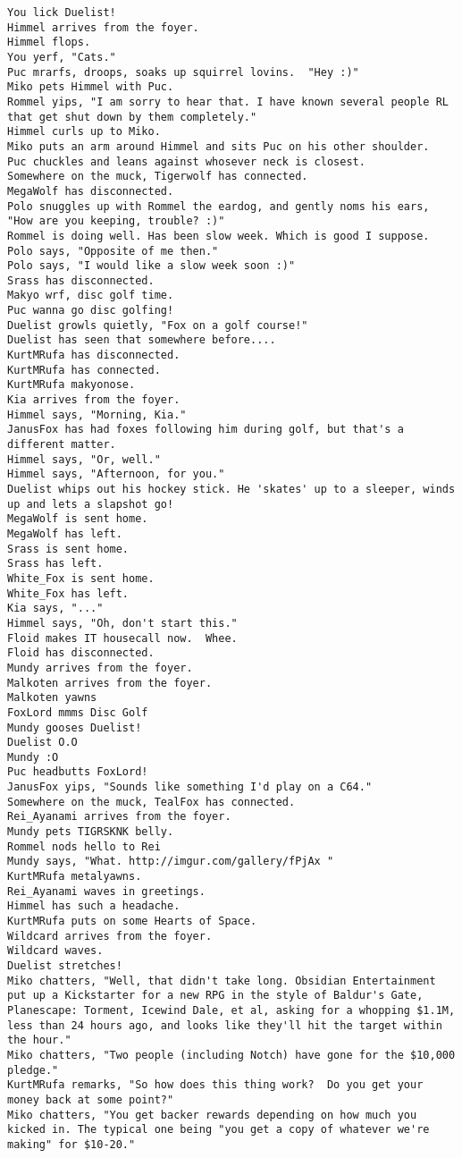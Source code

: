 \begin{verbatim}
You lick Duelist!
Himmel arrives from the foyer.
Himmel flops.
You yerf, "Cats."
Puc mrarfs, droops, soaks up squirrel lovins.  "Hey :)"
Miko pets Himmel with Puc.
Rommel yips, "I am sorry to hear that. I have known several people RL that get shut down by them completely."
Himmel curls up to Miko.
Miko puts an arm around Himmel and sits Puc on his other shoulder.
Puc chuckles and leans against whosever neck is closest.
Somewhere on the muck, Tigerwolf has connected.
MegaWolf has disconnected.
Polo snuggles up with Rommel the eardog, and gently noms his ears, "How are you keeping, trouble? :)"
Rommel is doing well. Has been slow week. Which is good I suppose.
Polo says, "Opposite of me then."
Polo says, "I would like a slow week soon :)"
Srass has disconnected.
Makyo wrf, disc golf time.
Puc wanna go disc golfing!
Duelist growls quietly, "Fox on a golf course!"
Duelist has seen that somewhere before....
KurtMRufa has disconnected.
KurtMRufa has connected.
KurtMRufa makyonose.
Kia arrives from the foyer.
Himmel says, "Morning, Kia."
JanusFox has had foxes following him during golf, but that's a different matter.
Himmel says, "Or, well."
Himmel says, "Afternoon, for you."
Duelist whips out his hockey stick. He 'skates' up to a sleeper, winds up and lets a slapshot go!
MegaWolf is sent home.
MegaWolf has left.
Srass is sent home.
Srass has left.
White_Fox is sent home.
White_Fox has left.
Kia says, "..."
Himmel says, "Oh, don't start this."
Floid makes IT housecall now.  Whee.
Floid has disconnected.
Mundy arrives from the foyer.
Malkoten arrives from the foyer.
Malkoten yawns
FoxLord mmms Disc Golf
Mundy gooses Duelist!
Duelist O.O
Mundy :O
Puc headbutts FoxLord!
JanusFox yips, "Sounds like something I'd play on a C64."
Somewhere on the muck, TealFox has connected.
Rei_Ayanami arrives from the foyer.
Mundy pets TIGRSKNK belly.
Rommel nods hello to Rei
Mundy says, "What. http://imgur.com/gallery/fPjAx "
KurtMRufa metalyawns.
Rei_Ayanami waves in greetings.
Himmel has such a headache.
KurtMRufa puts on some Hearts of Space.
Wildcard arrives from the foyer.
Wildcard waves.
Duelist stretches!
Miko chatters, "Well, that didn't take long. Obsidian Entertainment put up a Kickstarter for a new RPG in the style of Baldur's Gate, Planescape: Torment, Icewind Dale, et al, asking for a whopping $1.1M, less than 24 hours ago, and looks like they'll hit the target within the hour."
Miko chatters, "Two people (including Notch) have gone for the $10,000 pledge."
KurtMRufa remarks, "So how does this thing work?  Do you get your money back at some point?"
Miko chatters, "You get backer rewards depending on how much you kicked in. The typical one being "you get a copy of whatever we're making" for $10-20."

\end{verbatim}
